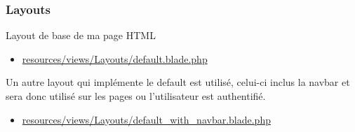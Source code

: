 \subsubsection{Layouts}

Layout de base de ma page HTML

\begin{itemize}[label=$\bullet$]
	\item \url{resources/views/Layouts/default.blade.php}
\end{itemize}

Un autre layout qui implémente le default est utilisé, celui-ci inclus la navbar et sera donc utilisé sur les pages ou l'utilisateur est authentifié.

\begin{itemize}[label=$\bullet$]
	\item \url{resources/views/Layouts/default\_with\_navbar.blade.php}
\end{itemize}
